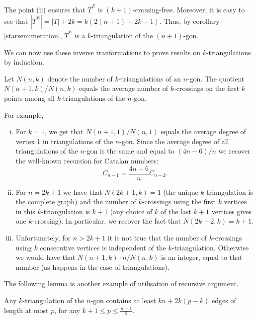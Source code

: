 \documentclass[12pt]{amsart}
\begin{document}
The point (ii) ensures that $\overline{T}^E$ is $(k+1)$-crossing-free. Moreover, it is easy to see that $|\overline{T}^E|=|T|+2k=k(2(n+1)-2k-1)$. Thus, by corollary \ref{starsenumeration}, $\overline{T}^E$ is a $k$-triangulation of the $(n+1)$-gon.

\medskip
We can now use these inverse tranformations to prove results on $k$-triangulations by induction. 

\begin{corollary}
Let $N(n,k)$ denote the number of $k$-triangulations of an $n$-gon. The quotient $N(n+1,k)/N(n,k)$ equals the average number of $k$-crossings on the first $k$ points among all $k$-triangulations of the $n$-gon.
\end{corollary}

For example,
\begin{enumerate}[(i)]
\item For $k=1$, we get that $N(n+1,1)/N(n,1)$ equals the average degree of vertex 1 in triangulations of the $n$-gon. Since the average degree of all triangulations of the $n$-gon is the same and equal to $(4n-6)/n$ we recover the well-known recursion for Catalan numbers:
$$C_{n-1}=\frac{4n-6}{n}C_{n-2}.$$

\item For $n=2k+1$ we have that $N(2k+1,k)=1$ (the unique $k$-triangulation is the complete graph)
and the number of $k$-crossings using the first $k$ vertices in this $k$-triangulation is $k+1$ (any choice of $k$ of the last $k+1$ vertices gives one $k$-crossing). In particular, we recover the fact that $N(2k+2,k)=k+1$.

\item Unfortunately, for $n>2k+1$ it is not true that the number of $k$-crossings using $k$ consecutive vertices is independent of the $k$-triangulation. Otherwise we would have that  $N(n+1,k)\cdot n /N(n,k)$ is an integer, equal to that number (as happens in the case of triangulations).
\end{enumerate}

\medskip
The following lemma is another example of utilisation of recursive argument. 

\begin{lemma}
Any $k$-triangulation of the $n$-gon contains at least $kn+2k(p-k)$ edges of length at most $p$, for any $k+1\le p\le \frac{n-1}{2}$.
\end{lemma}
\end{document}

